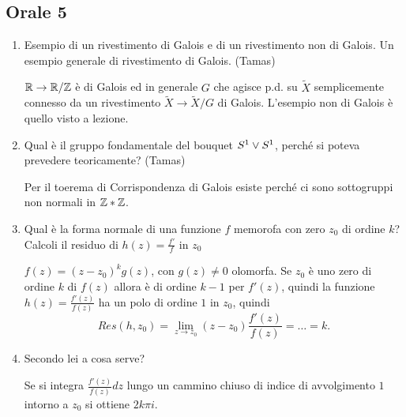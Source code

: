 \documentclass[]{article}
\begin{document}
\subsection{Orale 5}
\begin{enumerate}
    \item Esempio di un rivestimento di Galois e di un rivestimento non di Galois. Un esempio generale di rivestimento di Galois. (Tamas)
    \begin{answer}
        $\mathbb{R} \to \mathbb{R} / \mathbb{Z}$ \`e di Galois ed in generale $G$ che agisce p.d. su $\tilde{X}$ semplicemente connesso da un rivestimento $\tilde{X} \to \tilde{X} / G$ di Galois. \nl
        L'esempio non di Galois \`e quello visto a lezione.
    \end{answer}
    \item Qual \`e il gruppo fondamentale del bouquet $S^{1} \vee S^{1}$, perch\'e si poteva prevedere teoricamente? (Tamas)
    \begin{answer}
        Per il toerema di Corrispondenza di Galois esiste perch\'e ci sono sottogruppi non normali in $\mathbb{Z} * \mathbb{Z}$.
    \end{answer}
    \item Qual \`e la forma normale di una funzione $f$ memorofa con zero $z_0$ di ordine $k$? Calcoli il residuo di $h(z) = \frac{f'}{f}$ in $z_0$
    \begin{answer}
        $f(z) = (z - z_0)^k g(z)$, con $g(z) \neq 0$ olomorfa. \nl
        Se $z_0$ \`e uno zero di ordine $k$ di $f(z)$ allora \`e di ordine $k-1$ per $f'(z)$,
        quindi la funzione $h(z) = \frac{f'(z)}{f(z)}$ ha un polo di ordine $1$ in $z_0$, quindi
        \[
            Res(h, z_0) = \lim_{z \to z_0} (z - z_0)\frac{f'(z)}{f(z)} = \dots = k.
        \]
    \end{answer}
    \item Secondo lei a cosa serve? 
    \begin{answer}
        Se si integra $\frac{f'(z)}{f(z)} dz$ lungo un cammino chiuso di indice di avvolgimento $1$ intorno a $z_0$
        si ottiene $2 k \pi i$.
    \end{answer}
\end{enumerate}
\end{document}
